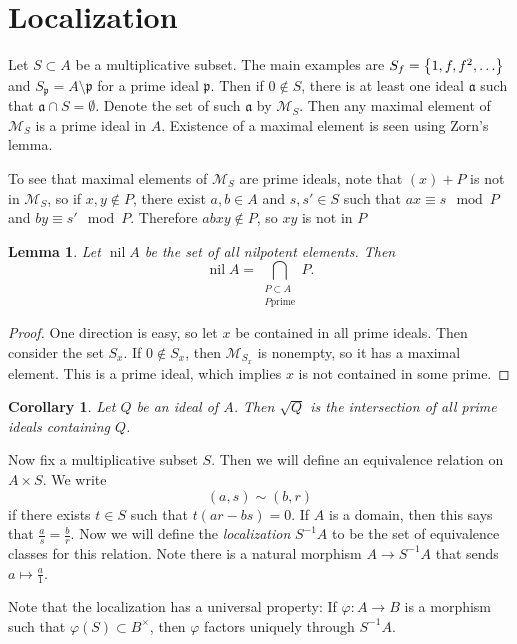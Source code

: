 \documentclass[leqno, openany]{memoir}
\newtheorem{cor}[thm]{Corollary}
\newtheorem{lem}[thm]{Lemma}
\theoremstyle{definition}
\theoremstyle{remark}
\theoremstyle{plain}
\theoremstyle{definition}
\theoremstyle{remark}
\newcommand{\mc}[1]{\mathcal{#1}}
\newcommand{\mf}[1]{\mathfrak{#1}}
\begin{document}
\section{Localization}%

Let $S \subset A$ be a multiplicative subset. The main examples are $S_f =
\qty{1,f,f^2, \ldots}$ and $S_{\mf{p}} = A \setminus \mf{p}$ for a prime ideal
$\mf{p}$. Then if $0 \notin S$, there is at least one ideal $\mf{a}$ such that
$\mf{a} \cap S = \emptyset$. Denote the set of such $\mf{a}$ by $\mc{M}_S$.
Then any maximal element of $\mc{M}_S$ is a prime ideal in $A$. Existence of a
maximal element is seen using Zorn's lemma.

To see that maximal elements of $\mc{M}_S$ are prime ideals, note that $(x) +
P$ is not in $\mc{M}_S$, so if $x,y \notin P$, there exist $a,b \in A$ and
$s,s' \in S$ such that $ax \equiv s \mod P$ and $by \equiv s' \mod P$.
Therefore $abxy \notin P$, so $xy$ is not in $P$

\begin{lem} Let $\operatorname{nil} A$ be the set of all nilpotent elements.
    Then \[ \operatorname{nil} A = \bigcap_{\substack{P \subset A \\ P \text{
    prime}}} P. \] \end{lem}

\begin{proof} One direction is easy, so let $x$ be contained in all prime
    ideals. Then consider the set $S_x$. If $0 \notin S_x$, then $\mc{M}_{S_x}$
    is nonempty, so it has a maximal element. This is a prime ideal, which
    implies $x$ is not contained in some prime.  \end{proof}

\begin{cor} Let $Q$ be an ideal of $A$. Then $\sqrt{Q}$ is the intersection of
all prime ideals containing $Q$.  \end{cor}

Now fix a multiplicative subset $S$. Then we will define an equivalence
relation on $A \times S$. We write \[ (a,s) \sim (b,r) \] if there exists $t
\in S$ such that $t(ar - bs) = 0$. If $A$ is a domain, then this says that
$\frac{a}{s} = \frac{b}{r}$. Now we will define the \textit{localization}
$S^{-1}A$ to be the set of equivalence classes for this relation. Note there is
a natural morphism $A \to S^{-1}A$ that sends $a \mapsto \frac{a}{1}$.

Note that the localization has a universal property: If $\varphi:A \to B$ is a
morphism such that $\varphi(S) \subset B^{\times}$, then $\varphi$ factors
uniquely through $S^{-1}A$.
\end{document}
